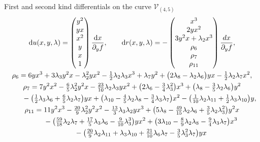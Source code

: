 \documentclass[pdftex]{sigma}
\numberwithin{equation}{section}
\newcommand{\rmd}{\mathrm{d}}
\begin{document}
First and second kind differentials on the curve $\mathcal{V}_{(4,5)}$
\begin{gather}
 \rmd u(x,y,\lambda) =\begin{pmatrix}
 y^2 \\ yx \\ x^2 \\ y \\ x \\ 1
 \end{pmatrix} \frac{\rmd x}{\partial_y f}, \qquad
 \rmd r(x,y,\lambda) = - \begin{pmatrix}
 x^3 \\ 2 y x^2 \\ 3 y^2 x + \lambda_2 x^3 \\ \rho_6 \\ \rho_7 \\ \rho_{11}
 \end{pmatrix}\frac{dx}{\partial_y f}, \label{Diffs45} \\
\notag
 \rho_6 = 6 y x^3 + 3\lambda_3 y^2 x - \lambda_2^2 y x^2 - \tfrac{1}{2} \lambda_2 \lambda_3 x^3 + \lambda_7 y^2 + \big(2\lambda_8 - \lambda_2 \lambda_6\big) y x - \tfrac{1}{2} \lambda_2 \lambda_7 x^2, \\
 \rho_7 = 7 y^2 x^2 - \tfrac{6}{5} \lambda_2^2 y^2 x - \tfrac{23}{10} \lambda_2 \lambda_3 y x^2 + \big(2\lambda_6 - \tfrac{3}{4}\lambda_3^2\big) x^3
 + \big(\lambda_8 - \tfrac{3}{5} \lambda_2 \lambda_6\big) y^2\nonumber \\
 \hphantom{\rho_7 =}{} - \big(\tfrac{1}{2} \lambda_3 \lambda_6 +\tfrac{6}{5} \lambda_2 \lambda_7\big) yx + \big(\lambda_{10}
 - \tfrac{4}{5} \lambda_2 \lambda_8 - \tfrac{3}{4}\lambda_3 \lambda_7 \big) x^2 - \big(\tfrac{1}{10}\lambda_2 \lambda_{11} + \tfrac{1}{2}\lambda_3 \lambda_{10}\big) y,\nonumber \\
 \rho_{11} = 11 y^2 x^3 -\tfrac{20}{9} \lambda_2^2 y^2 x^2 - \tfrac{13}{3} \lambda_3 \lambda_2 y x^3
 + \big(5\lambda_8 -\tfrac{49}{15} \lambda_2 \lambda_6 + \tfrac{3}{5}\lambda_2 \lambda_3^2\big) y^2 x\nonumber\\
 \hphantom{\rho_{11} =}{}
 - \big(\tfrac{59}{18}\lambda_2 \lambda_7 + \tfrac{17}{5} \lambda_3 \lambda_6 - \tfrac{9}{10}\lambda_3^3\big)y x^2 + \big(3\lambda_{10} - \tfrac{8}{9}\lambda_2 \lambda_8
 - \tfrac{9}{4}\lambda_3\lambda_7\big) x^3 \nonumber\\
 \hphantom{\rho_{11} =}{} - \big(\tfrac{20}{9}\lambda_2 \lambda_{11} + \lambda_3 \lambda_{10} + \tfrac{21}{10} \lambda_6 \lambda_7 - \tfrac{3}{5}\lambda_3^2\lambda_7\big) y x

\end{gather}
\end{document}
